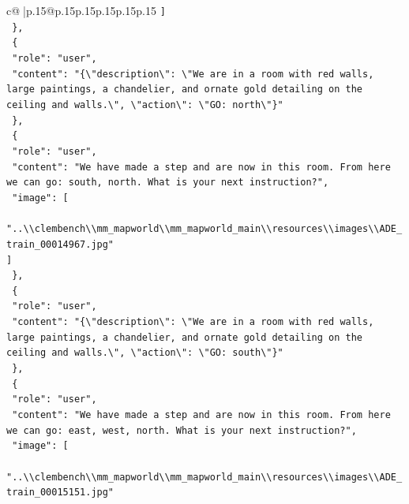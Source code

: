 \documentclass{article}
\begin{document}
{\begin{supertabular}{c@{$\;$}|p{.15\linewidth}@{}p{.15\linewidth}p{.15\linewidth}p{.15\linewidth}p{.15\linewidth}p{.15\linewidth}}
{{{\texttt{    {]}} \\
\texttt{  \},} \\
\texttt{  \{} \\
\texttt{    "role": "user",} \\
\texttt{    "content": "\{\textbackslash{}"description\textbackslash{}": \textbackslash{}"We are in a room with red walls, large paintings, a chandelier, and ornate gold detailing on the ceiling and walls.\textbackslash{}", \textbackslash{}"action\textbackslash{}": \textbackslash{}"GO: north\textbackslash{}"\}"} \\
\texttt{  \},} \\
\texttt{  \{} \\
\texttt{    "role": "user",} \\
\texttt{    "content": "We have made a step and are now in this room. From here we can go: south, north. What is your next instruction?",} \\
\texttt{    "image": {[}} \\
\texttt{      "..\textbackslash{}\textbackslash{}clembench\textbackslash{}\textbackslash{}mm\_mapworld\textbackslash{}\textbackslash{}mm\_mapworld\_main\textbackslash{}\textbackslash{}resources\textbackslash{}\textbackslash{}images\textbackslash{}\textbackslash{}ADE\_train\_00014967.jpg"} \\
\texttt{    {]}} \\
\texttt{  \},} \\
\texttt{  \{} \\
\texttt{    "role": "user",} \\
\texttt{    "content": "\{\textbackslash{}"description\textbackslash{}": \textbackslash{}"We are in a room with red walls, large paintings, a chandelier, and ornate gold detailing on the ceiling and walls.\textbackslash{}", \textbackslash{}"action\textbackslash{}": \textbackslash{}"GO: south\textbackslash{}"\}"} \\
\texttt{  \},} \\
\texttt{  \{} \\
\texttt{    "role": "user",} \\
\texttt{    "content": "We have made a step and are now in this room. From here we can go: east, west, north. What is your next instruction?",} \\
\texttt{    "image": {[}} \\
\texttt{      "..\textbackslash{}\textbackslash{}clembench\textbackslash{}\textbackslash{}mm\_mapworld\textbackslash{}\textbackslash{}mm\_mapworld\_main\textbackslash{}\textbackslash{}resources\textbackslash{}\textbackslash{}images\textbackslash{}\textbackslash{}ADE\_train\_00015151.jpg"} \\
}}}
\end{supertabular}}
\end{document}
